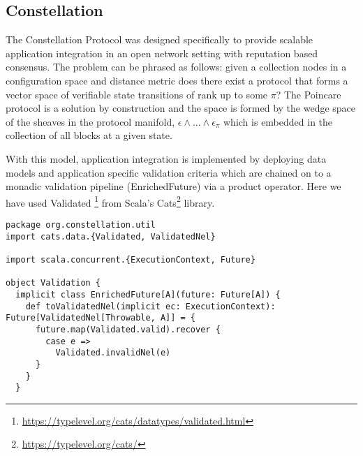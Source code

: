 \documentclass{article}
\begin{document}
\subsection{Constellation} 
The Constellation Protocol was designed specifically to provide scalable application integration in an open network setting with reputation based consensus. The problem can be phrased as follows: given a collection nodes in a configuration space and distance metric does there exist a protocol that forms a vector space of verifiable state transitions of rank up to some $\pi$? The Poincare protocol is a solution by construction and the space is formed by the wedge space of the sheaves in the protocol manifold, $\epsilon \wedge \dots \wedge \epsilon_\pi$ which is embedded in the collection of all blocks at a given state.

With this model, application integration is implemented by deploying data models and application specific validation criteria which are chained on to a monadic validation pipeline (EnrichedFuture) via a product operator. Here we have used Validated \footnote{\url{https://typelevel.org/cats/datatypes/validated.html}} from Scala's Cats\footnote{\url{https://typelevel.org/cats/}} library. 

\begin{lstlisting}[caption={Validation monad in Constellation}, style=myScalastyle]
package org.constellation.util
import cats.data.{Validated, ValidatedNel}

import scala.concurrent.{ExecutionContext, Future}

object Validation {
  implicit class EnrichedFuture[A](future: Future[A]) {
    def toValidatedNel(implicit ec: ExecutionContext): Future[ValidatedNel[Throwable, A]] = {
      future.map(Validated.valid).recover {
        case e =>
          Validated.invalidNel(e)
      }
    }
  }
\end{lstlisting}
\end{document}
